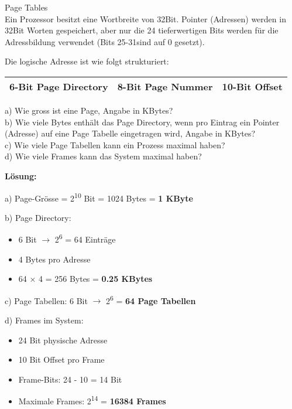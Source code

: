 \begin{example2}{Page Tables}\\
    Ein Prozessor besitzt eine Wortbreite von 32Bit. Pointer (Adressen) werden in 32Bit Worten gespeichert, aber nur die 24 tieferwertigen Bits werden für die Adressbildung verwendet (Bits 25-31sind auf 0 gesetzt).
    
    Die logische Adresse ist wie folgt strukturiert:
    \begin{center}
    \begin{tabular}{|c|c|c|}
    \hline
    6-Bit Page Directory & 8-Bit Page Nummer & 10-Bit Offset \\
    \hline
    \end{tabular}
    \end{center}
    
    a) Wie gross ist eine Page, Angabe in KBytes?\\
    b) Wie viele Bytes enthält das Page Directory, wenn pro Eintrag ein Pointer (Adresse) auf eine Page Tabelle eingetragen wird, Angabe in KBytes?\\
    c) Wie viele Page Tabellen kann ein Prozess maximal haben?\\
    d) Wie viele Frames kann das System maximal haben?
    
    \tcblower

    \textbf{Lösung:}
    
    a) Page-Grösse = 2\textsuperscript{10} Bit = 1024 Bytes = \textbf{1 KByte}
    
    b) Page Directory:
    \begin{itemize}
        \item 6 Bit $\rightarrow$ 2\textsuperscript{6} = 64 Einträge
        \item 4 Bytes pro Adresse
        \item 64 × 4 = 256 Bytes = \textbf{0.25 KBytes}
    \end{itemize}
    
    c) Page Tabellen: 6 Bit $\rightarrow$ 2\textsuperscript{6} = \textbf{64 Page Tabellen}
    
    d) Frames im System:
    \begin{itemize}
        \item 24 Bit physische Adresse
        \item 10 Bit Offset pro Frame
        \item Frame-Bits: 24 - 10 = 14 Bit
        \item Maximale Frames: 2\textsuperscript{14} = \textbf{16384 Frames}
    \end{itemize}

\end{example2}


